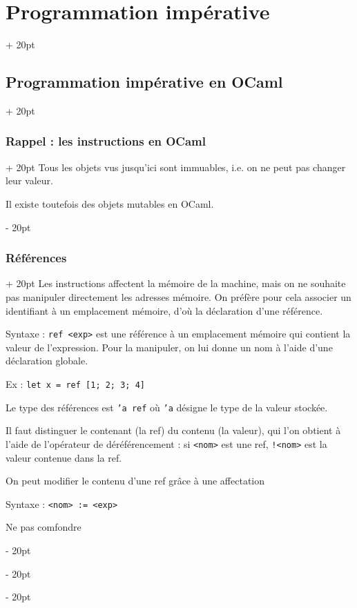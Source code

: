 \documentclass[a4paper, 12pt, twoside]{article}
\newcommand{\ind}[1][20pt]{\advance\leftskip + #1}
\newcommand{\deind}[1][20pt]{\advance\leftskip - #1}
\newenvironment{indentedenv}[1][20pt]{\par \ind[#1]}{\par \deind}
\newenvironment{indt}[2][20pt]{#2 \begin{indentedenv}[#1]}{\end{indentedenv}} %
\begin{document}
\begin{indt}{\section{Programmation impérative}}
\begin{indt}{\subsection{Programmation impérative en OCaml}}
\begin{indt}{\subsubsection{Rappel : les instructions en OCaml}}
                Tous les objets vus jusqu'ici sont immuables, i.e. on ne peut pas changer leur valeur.
                
                Il existe toutefois des objets mutables en OCaml.
            \end{indt}
            
            \vspace{6pt}
            
            \begin{indt}{\subsubsection{Références}}
                Les instructions affectent la mémoire de la machine, mais on ne souhaite pas manipuler directement les adresses mémoire. On préfère pour cela associer un identifiant à un emplacement mémoire, d'où la déclaration d'une référence.
                
                Syntaxe :
                \texttt{ref <exp>}
                est une référence à un emplacement mémoire qui contient la valeur de l'expression. Pour la manipuler, on lui donne un nom à l'aide d'une déclaration globale.
                
                Ex :
                \texttt{let x = ref [1; 2; 3; 4]}
                
                Le type des références est \texttt{'a ref} où \texttt{'a} désigne le type de la valeur stockée.
                
                Il faut distinguer le contenant (la ref) du contenu (la valeur), qui l'on obtient à l'aide de l'opérateur de déréférencement : si \texttt{<nom>} est une ref, \texttt{!<nom>} est la valeur contenue dans la ref.
                
                On peut modifier le contenu d'une ref grâce à une affectation
                
                Syntaxe : \texttt{<nom> := <exp>}
                
                Ne pas comfondre
                

\end{indt}
\end{indt}
\end{indt}
\end{document}
